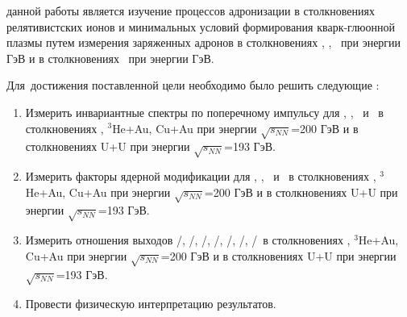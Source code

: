 \begin{comment}
\ifsynopsis
Этот абзац появляется только в~автореферате.
Для формирования блоков, которые будут обрабатываться только в~автореферате,
заведена проверка условия \verb!\!\verb!ifsynopsis!.
Значение условия задаётся в~основном файле документа (\verb!synopsis.tex! для
автореферата).
\else
Этот абзац появляется только в~диссертации.
Через проверку условия \verb!\!\verb!ifsynopsis!, задаваемого в~основном файле
документа (\verb!dissertation.tex! для диссертации), можно сделать новую
команду, обеспечивающую появление цитаты в~диссертации, но~не~в~автореферате.
\fi
\end{comment}

{\aim} данной работы является изучение процессов адронизации в столкновениях релятивистских ионов и минимальных условий формирования кварк-глюонной плазмы путем измерения заряженных адронов в столкновениях \pal, \heau, \cuau\, при энергии  ГэВ и в столкновениях \uu \ при энергии  ГэВ.

Для~достижения поставленной цели необходимо было решить следующие {\tasks}:
\begin{enumerate}[beginpenalty=10000] %
 \item Измерить инвариантные спектры по поперечному импульсу для \pipm, \Kpm, \prot \ и \aprot \ в столкновениях \pal, $^{3}$He+Au, Cu+Au при энергии $\sqrt{s_{NN}}$=200 ГэВ и в столкновениях U+U при энергии $\sqrt{s_{NN}}$=193 ГэВ.
\item Измерить факторы ядерной модификации для \pipm, \Kpm, \prot \ и \aprot \ в столкновениях  \pal, $^{3}$He+Au, Cu+Au при энергии $\sqrt{s_{NN}}$=200 ГэВ и в столкновениях U+U при энергии $\sqrt{s_{NN}}$=193 ГэВ.

\item Измерить отношения выходов \pim/\pip, \Km/\Kp, \prot/\aprot, \prot/\pip, \aprot/\pim, \Kp/\pip, \Km/\pim \ в столкновениях  \pal, $^{3}$He+Au, Cu+Au при энергии $\sqrt{s_{NN}}$=200 ГэВ и в столкновениях U+U при энергии $\sqrt{s_{NN}}$=193 ГэВ.
\item Провести физическую интерпретацию результатов.
\end{enumerate}


